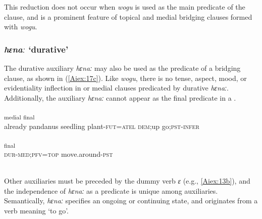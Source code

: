 \documentclass[output=paper]{LSP/langsci}
\begin{document}
This reduction does not occur when \textit{wogu} is used as the main predicate of the clause, and is a prominent feature of topical and medial bridging clauses formed with \textit{wogu}.


\subsubsection{\textit{hɛnaː} `durative'} 
\label{Aiaspect.hena}
The durative auxiliary \textit{hɛnaː} may also be used as the predicate of a bridging clause, as shown in (\ref{Aiex:17c}). Like \textit{wogu}, there is no tense, aspect, mood, or evidentiality inflection in  or medial clauses predicated by durative \textit{hɛnaː}. Additionally, the auxiliary \textit{hɛnaː} cannot appear as the final predicate in a . 

\begin{exe}
\ex \label{Aiex:17ac}
\begin{xlist}
\ex \label{Aiex:17a}
\gll	[ɛimɛ	oɡa	ɛ	ɡɛ-mɛna=ta]\textsubscript{medial}	\underline{\smash{[holo}}	\underline{\smash{anɛ-obo]}}\textsubscript{final}\\
already	pandanus	seedling	plant-\textsc{fut=atel}	\textsc{dem;}up	go;\textsc{pst-infer}\\
\glt ‎\\
\ex \label{Aiex:17b}
\textsubscript{final}\\
\textsc{dur-med;pfv=top}	move.around\textsc{-pst}\\
\glt	{}\\
\end{xlist}
\end{exe}


Other auxiliaries must be preceded by the dummy verb \textit{ɛ} (e.g., \ref{Aiex:13b}), and the independence of \textit{hɛnaː} as a predicate is unique among auxiliaries. Semantically, \textit{hɛnaː} specifies an ongoing  or continuing state, and originates from a verb meaning `to go'.
\end{document}
